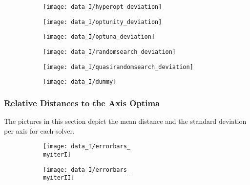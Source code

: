 \begin{figure}[h]
	\begin{subfigure}{0.5\textwidth}
		\texttt{[image: data\_I/hyperopt\_deviation]}
		\label{fig:hyperopt_deviation_I}
	\end{subfigure}
	\begin{subfigure}{0.5\textwidth}
		\texttt{[image: data\_I/optunity\_deviation]}
		\label{fig:optunity_deviation_I}
	\end{subfigure}
\end{figure}

\begin{figure}[h]
	\begin{subfigure}{0.5\textwidth}
		\texttt{[image: data\_I/optuna\_deviation]} 
		\label{fig:optuna_deviation_I}
	\end{subfigure}
	\begin{subfigure}{0.5\textwidth}
		\texttt{[image: data\_I/randomsearch\_deviation]}
		\label{fig:randomsearch_deviation_I}
	\end{subfigure}
\end{figure}

\begin{figure}[h]
	\begin{subfigure}{0.5\textwidth}
		\texttt{[image: data\_I/quasirandomsearch\_deviation]} 
		\label{fig:quasirandomsearch_deviation_I}
	\end{subfigure}
	\begin{subfigure}{0.5\textwidth}
		\texttt{[image: data\_I/dummy]}
		\label{fig:dummy2_I}
	\end{subfigure}
\end{figure}


\newpage


\subsubsection{Relative Distances to the Axis Optima}

The pictures in this section depict the mean distance and the standard deviation per axis for each solver.

\begin{figure}[h]
	\begin{subfigure}{0.5\textwidth}
		\texttt{[image: data\_I/errorbars\_\\myiterI]}
		\label{fig:errorbars_\myiterI_I}
	\end{subfigure}
	\begin{subfigure}{0.5\textwidth}
		\texttt{[image: data\_I/errorbars\_\\myiterII]}
		\label{fig:errorbars_\myiterII_I}
	\end{subfigure}
\end{figure}

